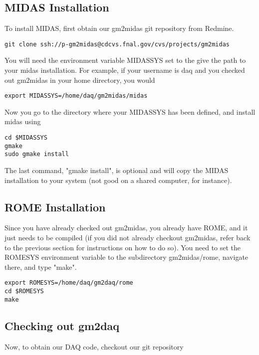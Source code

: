 \subsection{MIDAS Installation}

To install MIDAS, first obtain our gm2midas git repository from Redmine.

\begin{verbatim}
git clone ssh://p-gm2midas@cdcvs.fnal.gov/cvs/projects/gm2midas
\end{verbatim}

You will need the environment variable MIDASSYS set to the give the path to your midas installation. For example, if your username is daq and you checked out gm2midas in your home directory, you would

\begin{verbatim}
export MIDASSYS=/home/daq/gm2midas/midas
\end{verbatim}

Now you go to the directory where your MIDASSYS has been defined, and install midas using

\begin{verbatim}
cd $MIDASSYS
gmake
sudo gmake install
\end{verbatim}

The last command, "gmake install", is optional and will copy the MIDAS installation to your system (not good on a shared computer, for instance). 

\subsection{ROME Installation}

Since you have already checked out gm2midas, you already have ROME, and it just needs to be compiled (if you did not already checkout gm2midas, refer back to the previous section for instructions on how to do so). You need to set the ROMESYS environment variable to the subdirectory gm2midas/rome, navigate there, and type "make". 

\begin{verbatim}
export ROMESYS=/home/daq/gm2daq/rome
cd $ROMESYS
make
\end{verbatim}

\subsection{Checking out gm2daq}

Now, to obtain our DAQ code, checkout our git repository


